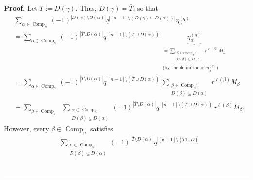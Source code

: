 \documentclass[numbers=enddot,12pt,final,onecolumn,notitlepage]{scrartcl}%
\theoremstyle{definition}
\newenvironment{proof}[1][Proof]{\noindent\textbf{#1.} }{\ \rule{0.5em}{0.5em}}
\let\sumnonlimits\sum
\renewcommand{\sum}{\sumnonlimits\limits}
\newenvironment{vershort}{}{}
\begin{document}
\begin{vershort}
\begin{proof}
Let $T:=\overline{D\left(  \gamma\right)  }$. Thus, $D\left(  \gamma\right)
=\overline{T}$, so that%
\begin{align*}
&  \sum_{\alpha\in\operatorname*{Comp}\nolimits_{n}}\left(  -1\right)
^{\left\vert D\left(  \gamma\right)  \setminus D\left(  \alpha\right)
\right\vert }q^{\left\vert \left[  n-1\right]  \setminus\left(  D\left(
\gamma\right)  \cup D\left(  \alpha\right)  \right)  \right\vert }\eta
_{\alpha}^{\left(  q\right)  }\\
&  =\sum_{\alpha\in\operatorname*{Comp}\nolimits_{n}}\left(  -1\right)
^{\left\vert \overline{T}\setminus D\left(  \alpha\right)  \right\vert
}q^{\left\vert \left[  n-1\right]  \setminus\left(  \overline{T}\cup D\left(
\alpha\right)  \right)  \right\vert }\underbrace{\eta_{\alpha}^{\left(
q\right)  }}_{\substack{=\sum_{\substack{\beta\in\operatorname*{Comp}%
\nolimits_{n};\\D\left(  \beta\right)  \subseteq D\left(  \alpha\right)
}}r^{\ell\left(  \beta\right)  }M_{\beta}\\\text{(by the definition of }%
\eta_{\alpha}^{\left(  q\right)  }\text{)}}}\\
&  =\sum_{\alpha\in\operatorname*{Comp}\nolimits_{n}}\left(  -1\right)
^{\left\vert \overline{T}\setminus D\left(  \alpha\right)  \right\vert
}q^{\left\vert \left[  n-1\right]  \setminus\left(  \overline{T}\cup D\left(
\alpha\right)  \right)  \right\vert }\sum_{\substack{\beta\in
\operatorname*{Comp}\nolimits_{n};\\D\left(  \beta\right)  \subseteq D\left(
\alpha\right)  }}r^{\ell\left(  \beta\right)  }M_{\beta}\\
&  =\sum_{\beta\in\operatorname*{Comp}\nolimits_{n}}\ \ \sum_{\substack{\alpha
\in\operatorname*{Comp}\nolimits_{n};\\D\left(  \beta\right)  \subseteq
D\left(  \alpha\right)  }}\left(  -1\right)  ^{\left\vert \overline
{T}\setminus D\left(  \alpha\right)  \right\vert }q^{\left\vert \left[
n-1\right]  \setminus\left(  \overline{T}\cup D\left(  \alpha\right)  \right)
\right\vert }r^{\ell\left(  \beta\right)  }M_{\beta}.
\end{align*}
However, every $\beta\in\operatorname*{Comp}\nolimits_{n}$ satisfies%
\begin{align*}
&  \sum_{\substack{\alpha\in\operatorname*{Comp}\nolimits_{n};\\D\left(
\beta\right)  \subseteq D\left(  \alpha\right)  }}\left(  -1\right)
^{\left\vert \overline{T}\setminus D\left(  \alpha\right)  \right\vert
}q^{\left\vert \left[  n-1\right]  \setminus\left(  \overline{T}\cup D\left(
}
\end{align*}
\end{proof}
\end{vershort}
\end{document}
